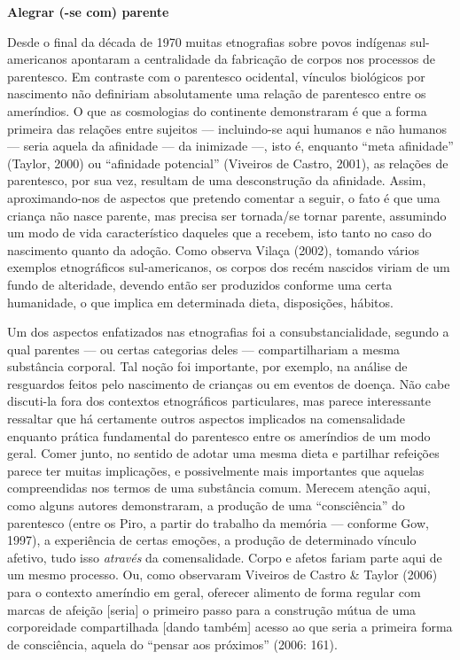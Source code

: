 \textbf{Alegrar (-se com) parente}

Desde o final da década de 1970 muitas etnografias sobre povos indígenas
sul-americanos apontaram a centralidade da fabricação de corpos nos
processos de parentesco. Em contraste com o parentesco ocidental,
vínculos biológicos por nascimento não definiriam absolutamente uma
relação de parentesco entre os ameríndios. O que as cosmologias do
continente demonstraram é que a forma primeira das relações entre
sujeitos --- incluindo-se aqui humanos e não humanos --- seria aquela da
afinidade --- da inimizade ---, isto é, enquanto ``meta afinidade''
(Taylor, 2000) ou ``afinidade potencial'' (Viveiros de Castro, 2001), as
relações de parentesco, por sua vez, resultam de uma desconstrução da
afinidade. Assim, aproximando-nos de aspectos que pretendo comentar a
seguir, o fato é que uma criança não nasce parente, mas precisa ser
tornada/se tornar parente, assumindo um modo de vida característico
daqueles que a recebem, isto tanto no caso do nascimento quanto da
adoção. Como observa Vilaça (2002), tomando vários exemplos etnográficos
sul-americanos, os corpos dos recém nascidos viriam de um fundo de
alteridade, devendo então ser produzidos conforme uma certa humanidade,
o que implica em determinada dieta, disposições, hábitos.

Um dos aspectos enfatizados nas etnografias foi a consubstancialidade,
segundo a qual parentes --- ou certas categorias deles ---
compartilhariam a mesma substância corporal. Tal noção foi importante,
por exemplo, na análise de resguardos feitos pelo nascimento de crianças
ou em eventos de doença. Não cabe discuti-la fora dos contextos
etnográficos particulares, mas parece interessante ressaltar que há
certamente outros aspectos implicados na comensalidade enquanto prática
fundamental do parentesco entre os ameríndios de um modo geral. Comer
junto, no sentido de adotar uma mesma dieta e partilhar refeições parece
ter muitas implicações, e possivelmente mais importantes que aquelas
compreendidas nos termos de uma substância comum. Merecem atenção aqui,
como alguns autores demonstraram, a produção de uma ``consciência'' do
parentesco (entre os Piro, a partir do trabalho da memória --- conforme
Gow, 1997), a experiência de certas emoções, a produção de determinado
vínculo afetivo, tudo isso \emph{através} da comensalidade. Corpo e
afetos fariam parte aqui de um mesmo processo. Ou, como observaram
Viveiros de Castro \& Taylor (2006) para o contexto ameríndio em geral,
oferecer alimento de forma regular com marcas de afeição {[}seria{]} o
primeiro passo para a construção mútua de uma corporeidade compartilhada
{[}dando também{]} acesso ao que seria a primeira forma de consciência,
aquela do ``pensar aos próximos'' (2006: 161).

